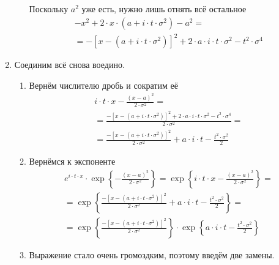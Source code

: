 \begin{enumerate}
\begin{enumerate}
                Поскольку $a^2$ уже есть, нужно лишь отнять всё остальное
                \begin{align*}
                    - x^2 + 2 \cdot x \cdot \left( a
                        + i \cdot t \cdot \sigma^2 \right) - a^2=\\
                    = -\left[ x
                        - \left( a + i \cdot t \cdot \sigma^2 \right) \right]^2
                        + 2 \cdot a \cdot i \cdot t \cdot \sigma^2
                        - t^2 \cdot \sigma^4
                \end{align*}
        \end{enumerate}
    \item Соединим всё снова воедино.
        \begin{enumerate}
            \item Вернём числителю дробь и сократим её
                \begin{align*}
                    i \cdot t \cdot x -
                            \frac{\left( x-a \right)^2}{2 \cdot \sigma^2} = \\
                        = \frac{-\left[ x - \left( a
                                + i \cdot t \cdot \sigma^2 \right) \right]^2
                            + 2 \cdot a \cdot i \cdot t \cdot \sigma^2
                            - t^2 \cdot \sigma^4}{2 \cdot \sigma^2} = \\
                        = \frac{-\left[ x - \left( a
                                + i \cdot t \cdot \sigma^2 \right) \right]^2}
                                {2 \cdot \sigma^2}
                            + a \cdot i \cdot t
                            - \frac{t^2 \cdot \sigma^2}{2}
                \end{align*}

            \item Вернёмся к экспоненте
                \begin{align*}
                    e^{i \cdot t \cdot x}
                            \cdot \exp{\left\{-\frac{\left( x-a \right)^2}
                                {2 \cdot \sigma^2} \right\}}
                        = \exp{\left\{i \cdot t \cdot x
                                - \frac{\left( x-a \right)^2}{2 \cdot \sigma^2}
                            \right\}} = \\
                        = \exp{\left\{ \frac{-\left[ x - \left( a
                                + i \cdot t \cdot \sigma^2 \right) \right]^2}
                                {2 \cdot \sigma^2}
                            + a \cdot i \cdot t
                            - \frac{t^2 \cdot \sigma^2}{2} \right\}} = \\
                        = \exp{\left\{ \frac{-\left[ x - \left( a
                                + i \cdot t \cdot \sigma^2 \right) \right]^2}
                                {2 \cdot \sigma^2} \right\}}
                            \cdot \exp{ \left\{ a \cdot i \cdot t
                                - \frac{t^2 \cdot \sigma^2}{2}  \right\}}
                \end{align*}
            \item Выражение стало очень громоздким, поэтому введём две замены.


\end{enumerate}
\end{enumerate}
